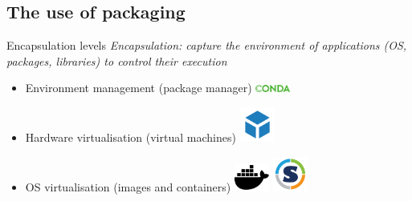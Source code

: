 \subsection{The use of packaging}
\begin{frame}[<+->]{Encapsulation levels}
\textit{Encapsulation: capture the environment of applications (OS, packages, libraries) to control their execution}
\begin{itemize}[<+->]
	\item Environment management (package manager) \includegraphics[width=0.09\textwidth]{images/conda_logo.pdf} 
	\item Hardware virtualisation (virtual machines) \includegraphics[width=0.09\textwidth]{images/VM_logo.png} 
	\item OS virtualisation (images and containers) \includegraphics[width=0.09\textwidth]{images/docker.pdf} \includegraphics[width=0.09\textwidth]{images/singularity_logo.pdf} 

\end{itemize}
\end{frame}

